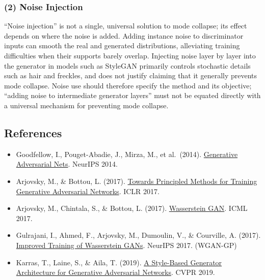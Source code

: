 \hypertarget{noise-injection}{%
\subsubsection{(2) Noise Injection}\label{noise-injection}}

``Noise injection'' is not a single, universal solution to mode collapse; its effect depends on where the noise is added. Adding instance noise to discriminator inputs can smooth the real and generated distributions, alleviating training difficulties when their supports barely overlap. Injecting noise layer by layer into the generator in models such as StyleGAN primarily controls stochastic details such as hair and freckles, and does not justify claiming that it generally prevents mode collapse. Noise use should therefore specify the method and its objective; ``adding noise to intermediate generator layers'' must not be equated directly with a universal mechanism for preventing mode collapse.

\FloatBarrier
{}
\hypertarget{references-39}{%
\subsection{References}\label{references-39}}

\vspace{0.25em}
\begin{itemize}
\tightlist
\item
  Goodfellow, I., Pouget-Abadie, J., Mirza, M., et al.~(2014). \href{https://papers.nips.cc/paper/5423-generative-adversarial-nets}{Generative Adversarial Nets}. NeurIPS 2014.
\item
  Arjovsky, M., \& Bottou, L. (2017). \href{https://arxiv.org/abs/1701.04862}{Towards Principled Methods for Training Generative Adversarial Networks}. ICLR 2017.
\item
  Arjovsky, M., Chintala, S., \& Bottou, L. (2017). \href{https://arxiv.org/abs/1701.07875}{Wasserstein GAN}. ICML 2017.
\item
  Gulrajani, I., Ahmed, F., Arjovsky, M., Dumoulin, V., \& Courville, A. (2017). \href{https://proceedings.neurips.cc/paper/2017/hash/892c3b1c6dccd52936e27cbd0ff683d6-Abstract.html}{Improved Training of Wasserstein GANs}. NeurIPS 2017. (WGAN-GP)
\item
  Karras, T., Laine, S., \& Aila, T. (2019). \href{https://openaccess.thecvf.com/content_CVPR_2019/html/Karras_A_Style-Based_Generator_Architecture_for_Generative_Adversarial_Networks_CVPR_2019_paper.html}{A Style-Based Generator Architecture for Generative Adversarial Networks}. CVPR 2019.
\end{itemize}

\clearpage
